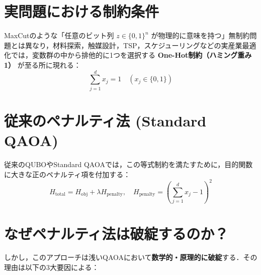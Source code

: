\documentclass[11pt,a4paper,oneside,openany]{ltjsbook}
\theoremstyle{definition}
\theoremstyle{plain}
\theoremstyle{remark}
\begin{document}
\vspace{-2.5mm}
\section{実問題における制約条件}
MaxCutのような「任意のビット列 $z \in \{0, 1\}^n$ が物理的に意味を持つ」無制約問題とは異なり，材料探索，触媒設計，TSP，スケジューリングなどの実産業最適化では，変数群の中から排他的に1つを選択する \textbf{One-Hot制約（ハミング重み1）} が至る所に現れる：
\begin{equation}
    \sum_{j=1}^{d} x_j = 1 \quad (x_j \in \{0, 1\})
\end{equation}

\vspace{-2.5mm}
\section{従来のペナルティ法 (Standard QAOA)}
従来のQUBOやStandard QAOAでは，この等式制約を満たすために，目的関数に大きな正のペナルティ項を付加する\cite{lucas2014ising}：
\begin{equation}
    H_{\text{total}} = H_{\text{obj}} + \lambda H_{\text{penalty}}, \quad H_{\text{penalty}} = \left( \sum_{j=1}^d x_j - 1 \right)^2
\end{equation}

\vspace{-2.5mm}
\section{なぜペナルティ法は破綻するのか？}
しかし，このアプローチは浅いQAOAにおいて\textbf{数学的・原理的に破綻}する．その理由は以下の3大要因による：
\end{document}
